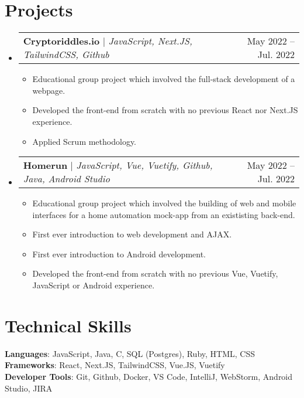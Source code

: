 \documentclass[letterpaper,11pt]{article}
\makeatletter
\newcommand{\resumeItem}[1]{
  \item\small{
    {#1 \vspace{-2pt}}
  }
}
\newcommand{\resumeProjectHeading}[2]{
    \item
    \begin{tabular*}{0.97\textwidth}{l@{\extracolsep{\fill}}r}
      \small#1 & #2 \\
    \end{tabular*}\vspace{-7pt}
}
\newcommand{\resumeSubHeadingListStart}{\begin{itemize}[leftmargin=0.15in, label={}]}
\newcommand{\resumeSubHeadingListEnd}{\end{itemize}}
\newcommand{\resumeItemListStart}{\begin{itemize}}
\newcommand{\resumeItemListEnd}{\end{itemize}\vspace{-5pt}}
\makeatother
\begin{document}
\section{Projects}
    \resumeSubHeadingListStart
      \resumeProjectHeading
          {\textbf{Cryptoriddles.io} $|$ \emph{JavaScript, Next.JS, TailwindCSS, Github}}{May 2022 -- Jul. 2022}
          \resumeItemListStart
          \resumeItem{Educational group project which involved the full-stack development of a webpage.}
            \resumeItem{Developed the front-end from scratch with no previous React nor Next.JS experience.}
            \resumeItem{Applied Scrum methodology.}
          \resumeItemListEnd
      \resumeProjectHeading
          {\textbf{Homerun} $|$ \emph{JavaScript, Vue, Vuetify, Github, Java, Android Studio}}{May 2022 -- Jul. 2022}
          \resumeItemListStart
          \resumeItem{Educational group project which involved the building of web and mobile interfaces for a home automation mock-app from an exististing back-end.}
          \resumeItem{First ever introduction to web development and AJAX.}
          \resumeItem{First ever introduction to Android development.}
            \resumeItem{Developed the front-end from scratch with no previous Vue, Vuetify, JavaScript or Android experience.}
          \resumeItemListEnd
    \resumeSubHeadingListEnd



%
\section{Technical Skills}
 \begin{itemize}[leftmargin=0.15in, label={}]
    \small{\item{
     \textbf{Languages}{: JavaScript, Java, C, SQL (Postgres), Ruby, HTML, CSS} \\
     \textbf{Frameworks}{: React, Next.JS, TailwindCSS, Vue.JS, Vuetify} \\
     \textbf{Developer Tools}{: Git, Github, Docker, VS Code, IntelliJ, WebStorm, Android Studio, JIRA}
    }}
 \end{itemize}


\end{document}
